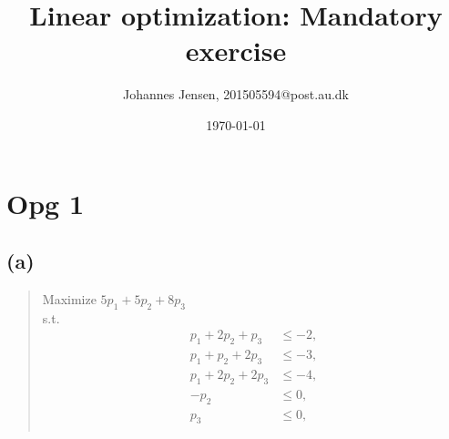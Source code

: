\documentclass{article}
\title{Linear optimization: Mandatory exercise}
\author{Johannes Jensen, 201505594@post.au.dk}
\date{\today}
\theoremstyle{definition}
\begin{document}
\maketitle

\section*{Opg 1}
\subsection*{(a)}
\begin{quote}
  Maximize $5p_1+5p_2+8p_3$ \\
  s.t.
  \begin{align*}
    p_1+2p_2+p_3 &\leq -2, \\
    p_1+p_2+2p_3 &\leq -3, \\
    p_1+2p_2+2p_3 &\leq -4, \\
    -p_2 &\leq 0, \\
    p_3 &\leq 0, \\
  \end{align*}
\end{quote}
\end{document}

